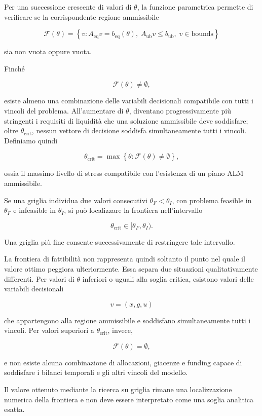 Per una successione crescente di valori di $\theta$, la funzione parametrica
permette di verificare se la corrispondente regione ammissibile

$$
\mathcal{F}(\theta)
=
\left\{
v:
A_{\mathrm{eq}}v=b_{\mathrm{eq}}(\theta),
\;
A_{\mathrm{ub}}v\leq b_{\mathrm{ub}},
\;
v\in\text{bounds}
\right\}
$$

\noindent sia non vuota oppure vuota.

Finch\'e

$$
\mathcal{F}(\theta)\neq\emptyset,
$$

\noindent esiste almeno una combinazione delle variabili decisionali compatibile con
tutti i vincoli del problema. All'aumentare di $\theta$, diventano progressivamente pi\`u stringenti i requisiti di liquidit\`a che una soluzione ammissibile deve soddisfare; oltre $\theta_{\mathrm{crit}}$, nessun vettore di decisione soddisfa simultaneamente tutti i vincoli. 
Definiamo quindi

$$
\theta_{\mathrm{crit}}
=
\max
\left\{
\theta:
\mathcal{F}(\theta)\neq\emptyset
\right\},
$$

\noindent ossia il massimo livello di stress compatibile con l'esistenza di un piano
ALM ammissibile.

Se una griglia individua due valori consecutivi $\theta_F<\theta_I$, con problema feasible in $\theta_F$ e infeasible in $\theta_I$, si pu\`o
localizzare la frontiera nell'intervallo

$$
\theta_{\mathrm{crit}}
\in
[\theta_F,\theta_I).
$$

Una griglia pi\`u fine consente successivamente di restringere tale
intervallo.

La frontiera di fattibilit\`a non rappresenta quindi soltanto il punto nel
quale il valore ottimo peggiora ulteriormente. Essa separa due situazioni
qualitativamente differenti. Per valori di $\theta$ inferiori o uguali alla
soglia critica, esistono valori delle variabili decisionali

$$
v=(x,g,u)
$$

\noindent che appartengono alla regione ammissibile e soddisfano simultaneamente tutti
i vincoli. Per valori superiori a $\theta_{\mathrm{crit}}$, invece,

$$
\mathcal{F}(\theta)=\emptyset,
$$

\noindent e non esiste alcuna combinazione di allocazioni, giacenze e funding capace di
soddisfare i bilanci temporali e gli altri vincoli del modello.

Il valore ottenuto mediante la ricerca su griglia rimane una localizzazione
numerica della frontiera e non deve essere interpretato come una soglia
analitica esatta.


